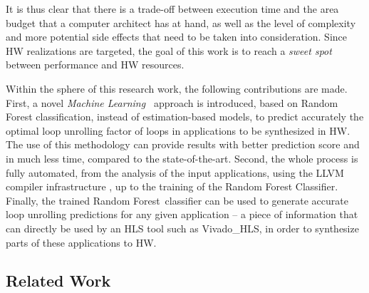 \documentclass[]{usiinfthesis}
\newcommand{\SoTA}{{state-of-the-art}}
\newcommand{\ML}{{Machine Learning}}
\newcommand{\RF}{{Random Forest}}
\begin{document}
It is thus clear that there is a trade-off between execution time and the area budget that 
a computer architect has at hand, as well as the level of complexity and more potential 
side effects that need to be taken into consideration. Since HW realizations are targeted, 
the goal of this work is to reach a {\em sweet spot} between performance and HW resources.\par

Within the sphere of this research work, the following contributions are made.
First, a novel {\em \ML\ }
approach is introduced, based on Random Forest classification, 
instead of estimation-based models, to predict 
accurately the optimal loop unrolling factor of loops in applications to be synthesized
in HW. The use of this methodology can provide results with better prediction score
and in much less time, compared to the \SoTA.
Second, the whole process is fully automated, 
from the analysis of the input applications, using the LLVM compiler infrastructure 
\cite{LattnerMar04}, up to the training of the Random Forest Classifier. 
Finally, the trained \RF\ classifier can be used to generate accurate loop unrolling predictions 
for any given application -- a piece of information that can 
directly be used by an HLS tool such as Vivado\_HLS, in order to synthesize parts of these 
applications to HW.

\subsection{Related Work}
\end{document}
